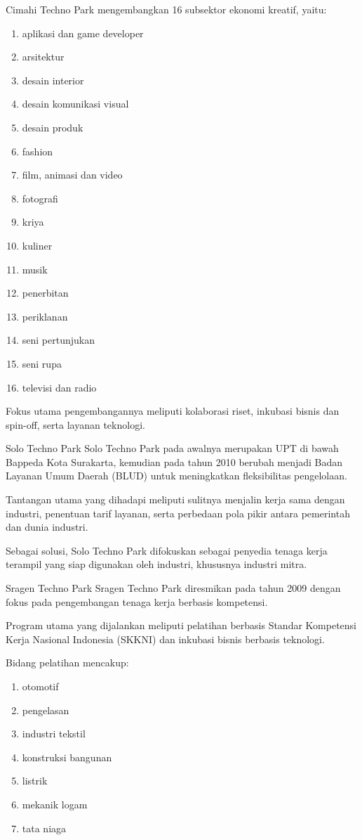 \documentclass[../wastek.tex]{subfiles}
\begin{document}
Cimahi Techno Park mengembangkan 16 subsektor ekonomi kreatif, yaitu:
\begin{enumerate}
	\item aplikasi dan game developer
	\item arsitektur
	\item desain interior
	\item desain komunikasi visual
	\item desain produk
	\item fashion
	\item film, animasi dan video
	\item fotografi
	\item kriya
	\item kuliner
	\item musik
	\item penerbitan
	\item periklanan
	\item seni pertunjukan
	\item seni rupa
	\item televisi dan radio
\end{enumerate}

Fokus utama pengembangannya meliputi kolaborasi riset, inkubasi bisnis dan spin-off, serta layanan teknologi.

\tabitem Solo Techno Park
Solo Techno Park pada awalnya merupakan UPT di bawah Bappeda Kota Surakarta, kemudian pada tahun 2010 berubah menjadi Badan Layanan Umum Daerah (BLUD) untuk meningkatkan fleksibilitas pengelolaan.

Tantangan utama yang dihadapi meliputi sulitnya menjalin kerja sama dengan industri, penentuan tarif layanan, serta perbedaan pola pikir antara pemerintah dan dunia industri.

Sebagai solusi, Solo Techno Park difokuskan sebagai penyedia tenaga kerja terampil yang siap digunakan oleh industri, khususnya industri mitra.

\tabitem Sragen Techno Park
Sragen Techno Park diresmikan pada tahun 2009 dengan fokus pada pengembangan tenaga kerja berbasis kompetensi.

Program utama yang dijalankan meliputi pelatihan berbasis Standar Kompetensi Kerja Nasional Indonesia (SKKNI) dan inkubasi bisnis berbasis teknologi.

Bidang pelatihan mencakup:
\begin{enumerate}
	\item otomotif
	\item pengelasan
	\item industri tekstil
	\item konstruksi bangunan
	\item listrik
	\item mekanik logam
	\item tata niaga
\end{enumerate}
\end{document}

